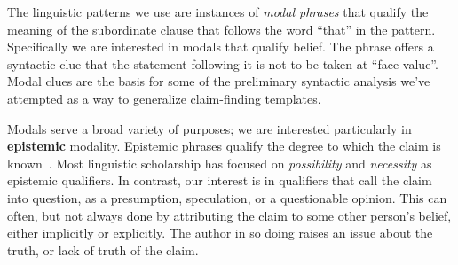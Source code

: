 
The linguistic patterns we use are instances of {\it modal phrases} that qualify the meaning of the subordinate clause that follows the word ``that'' in the pattern. Specifically we are interested in
modals that qualify belief.  The phrase offers a syntactic clue that the statement following it
is not to be taken at ``face value''.  Modal clues are the basis for some of the preliminary syntactic analysis
we've attempted as a way to generalize claim-finding templates. 

Modals serve a broad variety of purposes;
we are interested particularly in  {\bf epistemic} modality. Epistemic phrases qualify the
degree to which the claim is known~\cite{Palmer.2001}. Most linguistic scholarship has focused on {\it
possibility} and {\it necessity} as epistemic qualifiers. In
contrast, our interest is in qualifiers that call the claim into
question, as a presumption, speculation, or a questionable
opinion. This can often, but not always done by attributing the claim
to some other person's belief, either implicitly or explicitly. The
author in so doing raises an issue about the truth, or lack of truth
of the claim.
